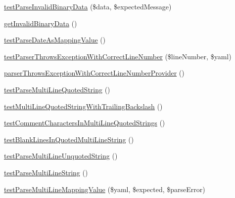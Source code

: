 \begin{DoxyCompactItemize}
\mbox{\hyperlink{class_symfony_1_1_component_1_1_yaml_1_1_tests_1_1_parser_test_a3c28a0d9f12b6c65fe69b5f7f0ea5773}{test\+Parse\+Invalid\+Binary\+Data}} (\$data, \$expected\+Message)
\item 
\mbox{\hyperlink{class_symfony_1_1_component_1_1_yaml_1_1_tests_1_1_parser_test_a4a20463b06f266fba70ebc074a558419}{get\+Invalid\+Binary\+Data}} ()
\item 
\mbox{\hyperlink{class_symfony_1_1_component_1_1_yaml_1_1_tests_1_1_parser_test_abf65e6777454b10bb6f0cf172831e26a}{test\+Parse\+Date\+As\+Mapping\+Value}} ()
\item 
\mbox{\hyperlink{class_symfony_1_1_component_1_1_yaml_1_1_tests_1_1_parser_test_a1ac7a072195797424c4011bd03be5ac2}{test\+Parser\+Throws\+Exception\+With\+Correct\+Line\+Number}} (\$line\+Number, \$yaml)
\item 
\mbox{\hyperlink{class_symfony_1_1_component_1_1_yaml_1_1_tests_1_1_parser_test_a60e1a2781eda54c6889b1c2ad19b61fb}{parser\+Throws\+Exception\+With\+Correct\+Line\+Number\+Provider}} ()
\item 
\mbox{\hyperlink{class_symfony_1_1_component_1_1_yaml_1_1_tests_1_1_parser_test_aaacb76d75e48e1fa0d2bd1f66eb1cded}{test\+Parse\+Multi\+Line\+Quoted\+String}} ()
\item 
\mbox{\hyperlink{class_symfony_1_1_component_1_1_yaml_1_1_tests_1_1_parser_test_a782f154b0e3166cd8b61f9b2cb388c36}{test\+Multi\+Line\+Quoted\+String\+With\+Trailing\+Backslash}} ()
\item 
\mbox{\hyperlink{class_symfony_1_1_component_1_1_yaml_1_1_tests_1_1_parser_test_a37cdcdb129cb4dcc7379ee72ac45ff22}{test\+Comment\+Characters\+In\+Multi\+Line\+Quoted\+Strings}} ()
\item 
\mbox{\hyperlink{class_symfony_1_1_component_1_1_yaml_1_1_tests_1_1_parser_test_a30886db94f49406064a643527cabfde7}{test\+Blank\+Lines\+In\+Quoted\+Multi\+Line\+String}} ()
\item 
\mbox{\hyperlink{class_symfony_1_1_component_1_1_yaml_1_1_tests_1_1_parser_test_a630865b4e0fc776de3dd20b1c9ef5170}{test\+Parse\+Multi\+Line\+Unquoted\+String}} ()
\item 
\mbox{\hyperlink{class_symfony_1_1_component_1_1_yaml_1_1_tests_1_1_parser_test_a733d8930b02ee563ff9e092794560852}{test\+Parse\+Multi\+Line\+String}} ()
\item 
\mbox{\hyperlink{class_symfony_1_1_component_1_1_yaml_1_1_tests_1_1_parser_test_a4ce82f6ded74fd7c43941b25796bc3b8}{test\+Parse\+Multi\+Line\+Mapping\+Value}} (\$yaml, \$expected, \$parse\+Error)
\item 

\end{DoxyCompactItemize}
